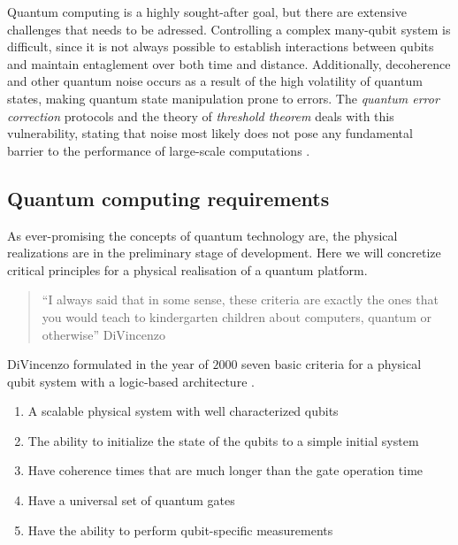 
Quantum computing is a highly sought-after goal, but there are extensive challenges that needs to be adressed. Controlling a complex many-qubit system is difficult, since it is not always possible to establish interactions between qubits \cite{DiVincenzo2000} and maintain entaglement over both time and distance. Additionally, decoherence and other quantum noise occurs as a result of the high volatility of quantum states, making quantum state manipulation prone to errors. The \textit{quantum error correction} protocols and the theory of \textit{threshold theorem} deals with this vulnerability, stating that noise most likely does not pose any fundamental barrier to the performance of large-scale computations \cite{Pavicic2006}.


\subsection{Quantum computing requirements}
As ever-promising the concepts of quantum technology are, the physical realizations are in the preliminary stage of development. Here we will concretize critical principles for a physical realisation of a quantum platform.

\begin{quote}
   ``I always said that in some sense, these criteria are exactly the ones that you would teach to kindergarten children about computers, quantum or otherwise'' DiVincenzo \cite{Georgescu2020}
\end{quote}

DiVincenzo formulated in the year of $2000$ seven basic criteria for a physical qubit system with a logic-based architecture \cite{DiVincenzo2000}.

\begin{enumerate}
  \item A scalable physical system with well characterized qubits
  \item The ability to initialize the state of the qubits to a simple initial system
  \item Have coherence times that are much longer than the gate operation time
  \item Have a universal set of quantum gates
  \item Have the ability to perform qubit-specific measurements
\end{enumerate}

